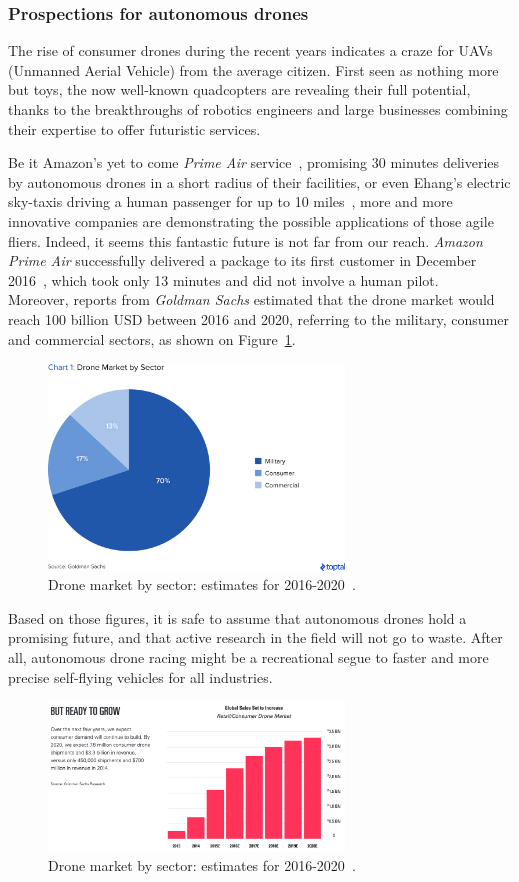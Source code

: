 \subsubsection{Prospections for autonomous drones}
The rise of consumer drones during the recent years indicates a craze for UAVs
(Unmanned Aerial Vehicle) from the average citizen. First seen as nothing more
but toys, the now well-known quadcopters are revealing their full potential,
thanks to the breakthroughs of robotics engineers and large businesses combining
their expertise to offer futuristic services.

Be it Amazon's yet to come \emph{Prime Air} service~\cite{PrimeAir}, promising
30 minutes deliveries by autonomous drones in a short radius of their
facilities, or even Ehang's electric sky-taxis driving a human passenger for up
to 10 miles~\cite{Ehang184}, more and more innovative companies are
demonstrating the possible applications of those agile fliers.  Indeed, it seems
this fantastic future is not far from our reach. \emph{Amazon Prime Air}
successfully delivered a package to its first customer in December
2016~\cite{PrimeAirFirst}, which took only 13 minutes and did not involve a
human pilot.\\

Moreover, reports from \emph{Goldman Sachs} \cite{TopTal} estimated that the
drone market would reach 100 billion USD between 2016 and 2020, referring to
the military, consumer and commercial sectors, as shown on
Figure~\ref{fig:toptal}.\\

\begin{figure}[h]
	\centering
	\includegraphics[width=0.7\textwidth]{figure/toptal.png}
	\caption{Drone market by sector: estimates for 2016-2020~\cite{TopTal}.}
	\label{fig:toptal}
\end{figure}

Based on those figures, it is safe to assume that autonomous drones hold a
promising future, and that active research in the field will not go to waste.
After all, autonomous drone racing might be a recreational segue to faster and
more precise self-flying vehicles for all industries.

\begin{figure}[h]
	\centering
	\includegraphics[width=0.7\textwidth]{figure/drone_market.png}
	\caption{Drone market by sector: estimates for 2016-2020~\cite{Goldman}.}
	\label{fig:goldmansachs}
\end{figure}
